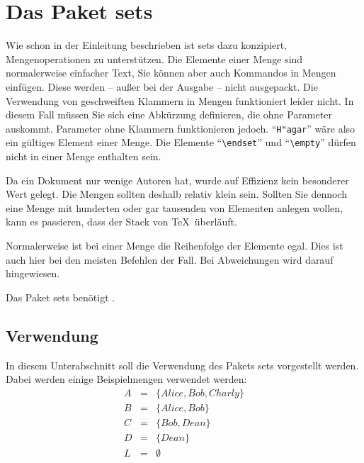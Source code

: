 \section{Das Paket sets}\label{sets}

Wie schon in der Einleitung beschrieben ist sets dazu konzipiert, Mengenoperationen zu unterstützen. Die Elemente einer Menge sind normalerweise einfacher Text, Sie können aber auch Kommandos in Mengen einfügen. Diese werden -- außer
bei der Ausgabe -- nicht ausgepackt. Die Verwendung von geschweiften Klammern in Mengen funktioniert leider nicht. In diesem Fall müssen Sie sich eine Abkürzung definieren, die ohne Parameter auskommt. Parameter ohne Klammern funktionieren jedoch. "`\verb|H"agar|"' wäre also ein gültiges Element einer Menge. Die Elemente "`\verb|\endset|"' und "`\verb|\empty|"' dürfen nicht in einer Menge enthalten sein.

Da ein Dokument nur wenige Autoren hat, wurde auf Effizienz kein besonderer Wert gelegt. Die Mengen sollten deshalb relativ klein sein. Sollten Sie dennoch eine Menge mit hunderten oder gar tausenden von Elementen anlegen wollen, kann es passieren, dass der Stack von \TeX\ überläuft.

Normalerweise ist bei einer Menge die Reihenfolge der Elemente egal. Dies ist auch hier bei den meisten Befehlen der Fall. Bei Abweichungen wird darauf hingewiesen.

Das Paket sets benötigt \LaTeXe.

\subsection{Verwendung}\label{sets-verwendung}

In diesem Unterabschnitt soll die Verwendung des Pakets sets vorgestellt werden. Dabei werden einige Beispielmengen verwendet werden:
\begin{eqnarray*}
	A &=& \{Alice, Bob, Charly\}\\
	B &=& \{Alice, Bob\}\\
	C &=& \{Bob, Dean\}\\
	D &=& \{Dean\}\\
	L &=& \emptyset
\end{eqnarray*}

